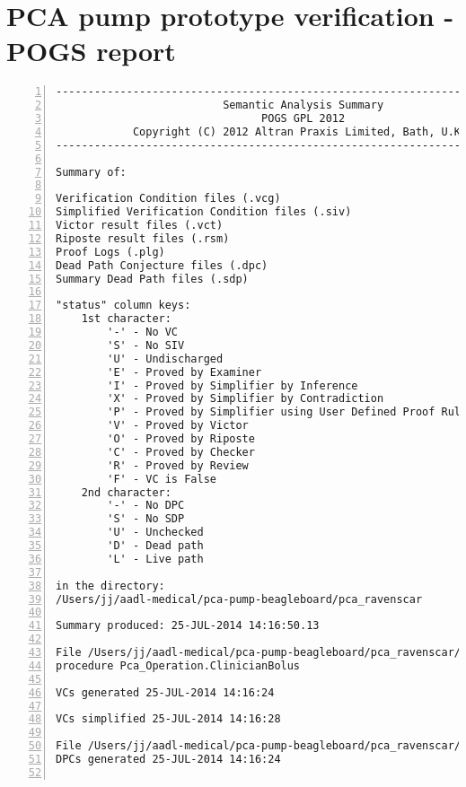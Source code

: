 
\cleardoublepage

\chapter{PCA pump prototype verification - POGS report}
\label{Appendix:pca_ravenscar:pogs}

\singlespacing
\begin{lstlisting}[gobble=0, numbers=left, caption={POGS report for PCA Pump prototype}, label={listing:pca_ravenscar:pogs_full}]
-------------------------------------------------------------------------------
                          Semantic Analysis Summary                            
                                POGS GPL 2012                                  
            Copyright (C) 2012 Altran Praxis Limited, Bath, U.K.               
-------------------------------------------------------------------------------

Summary of:

Verification Condition files (.vcg)
Simplified Verification Condition files (.siv)
Victor result files (.vct)
Riposte result files (.rsm)
Proof Logs (.plg)
Dead Path Conjecture files (.dpc)
Summary Dead Path files (.sdp)

"status" column keys:
    1st character:
        '-' - No VC
        'S' - No SIV
        'U' - Undischarged
        'E' - Proved by Examiner
        'I' - Proved by Simplifier by Inference
        'X' - Proved by Simplifier by Contradiction
        'P' - Proved by Simplifier using User Defined Proof Rules
        'V' - Proved by Victor
        'O' - Proved by Riposte
        'C' - Proved by Checker
        'R' - Proved by Review
        'F' - VC is False
    2nd character:
        '-' - No DPC
        'S' - No SDP
        'U' - Unchecked
        'D' - Dead path
        'L' - Live path

in the directory:
/Users/jj/aadl-medical/pca-pump-beagleboard/pca_ravenscar

Summary produced: 25-JUL-2014 14:16:50.13

File /Users/jj/aadl-medical/pca-pump-beagleboard/pca_ravenscar/pca_operation/clinicianbolus.vcg
procedure Pca_Operation.ClinicianBolus

VCs generated 25-JUL-2014 14:16:24

VCs simplified 25-JUL-2014 14:16:28

File /Users/jj/aadl-medical/pca-pump-beagleboard/pca_ravenscar/pca_operation/clinicianbolus.dpc
DPCs generated 25-JUL-2014 14:16:24


\end{lstlisting}
